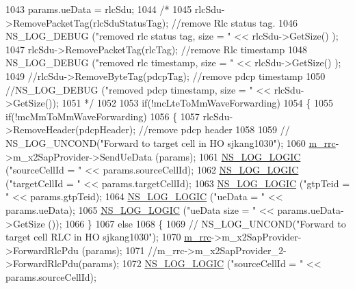 \begin{DoxyCode}
1043         params.ueData = rlcSdu;
1044         \textcolor{comment}{/*}
1045 \textcolor{comment}{        rlcSdu->RemovePacketTag(rlcSduStatusTag); //remove Rlc status tag.}
1046 \textcolor{comment}{        NS\_LOG\_DEBUG ("removed rlc status tag, size = " << rlcSdu->GetSize() );}
1047 \textcolor{comment}{        rlcSdu->RemovePacketTag(rlcTag);  //remove Rlc timestamp}
1048 \textcolor{comment}{        NS\_LOG\_DEBUG ("removed rlc timestamp, size = " << rlcSdu->GetSize() );}
1049 \textcolor{comment}{        //rlcSdu->RemoveByteTag(pdcpTag); //remove pdcp timestamp}
1050 \textcolor{comment}{        //NS\_LOG\_DEBUG ("removed pdcp timestamp, size = " << rlcSdu->GetSize());}
1051 \textcolor{comment}{        */}
1052 
1053         \textcolor{keywordflow}{if}(!mcLteToMmWaveForwarding)
1054         \{
1055           \textcolor{keywordflow}{if}(!mcMmToMmWaveForwarding)
1056           \{
1057             rlcSdu->RemoveHeader(pdcpHeader); \textcolor{comment}{//remove pdcp header}
1058 
1059            \textcolor{comment}{// NS\_LOG\_UNCOND("Forward to target cell in HO sjkang1030");}
1060             \hyperlink{classns3_1_1UeManager_ab4405e9f354c66e7c1a4c95832290f5b}{m\_rrc}->m\_x2SapProvider->SendUeData (params);
1061             \hyperlink{group__logging_ga88acd260151caf2db9c0fc84997f45ce}{NS\_LOG\_LOGIC} (\textcolor{stringliteral}{"sourceCellId = "} << params.sourceCellId);
1062             \hyperlink{group__logging_ga88acd260151caf2db9c0fc84997f45ce}{NS\_LOG\_LOGIC} (\textcolor{stringliteral}{"targetCellId = "} << params.targetCellId);
1063             \hyperlink{group__logging_ga88acd260151caf2db9c0fc84997f45ce}{NS\_LOG\_LOGIC} (\textcolor{stringliteral}{"gtpTeid = "} << params.gtpTeid);
1064             \hyperlink{group__logging_ga88acd260151caf2db9c0fc84997f45ce}{NS\_LOG\_LOGIC} (\textcolor{stringliteral}{"ueData = "} << params.ueData);
1065             \hyperlink{group__logging_ga88acd260151caf2db9c0fc84997f45ce}{NS\_LOG\_LOGIC} (\textcolor{stringliteral}{"ueData size = "} << params.ueData->GetSize ());
1066           \}
1067           \textcolor{keywordflow}{else}
1068           \{
1069            \textcolor{comment}{// NS\_LOG\_UNCOND("Forward to target cell RLC in HO sjkang1030");}
1070             \hyperlink{classns3_1_1UeManager_ab4405e9f354c66e7c1a4c95832290f5b}{m\_rrc}->m\_x2SapProvider->ForwardRlcPdu (params);
1071             \textcolor{comment}{//m\_rrc->m\_x2SapProvider\_2->ForwardRlcPdu(params);}
1072             \hyperlink{group__logging_ga88acd260151caf2db9c0fc84997f45ce}{NS\_LOG\_LOGIC} (\textcolor{stringliteral}{"sourceCellId = "} << params.sourceCellId);

\end{DoxyCode}

